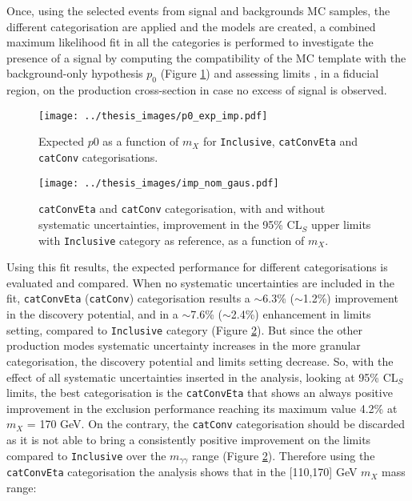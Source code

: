 \documentclass[a4paper, oneside, 11pt]{book}
\begin{document}
	Once, using the selected events from signal and backgrounds MC samples, the different categorisation are applied and the models are created, a combined maximum likelihood fit in all the categories is performed to investigate the presence of a signal by computing the compatibility of the MC template with the background-only hypothesis $p_0$ \cite{Statistic} (Figure \ref{fig:p0_comp}) and assessing limits \cite{Statistic}, in a fiducial region, on the production cross-section in case no excess of signal is observed.
	\iffalse
	\begin{figure}
		\centering
		\texttt{[image: ../thesis\_images/p0\_no\_catConvEta.pdf]}
		\caption{Expected $p_0$ values and observed ones values obtained by using signal+backgrounds template with $\mu$=1 and m$_X$ = 125 (140) GeV, for \texttt{Inclusive} categorisation, as function of $m_X$.}
		\label{fig:p0}
	\end{figure}
	\begin{figure}
		\centering
		\texttt{[image: ../thesis\_images/plot\_AsimovData\_0\_ggHyy\_MC\_no\_catConvEta\_syst\_HSM\_fid\_nom\_gaus.pdf]}
		\caption{95\% CL$_S$ upper limits plot for the \texttt{Inclusive} categorisation, as a function of $m_X$.}
		\label{fig:limits}
	\end{figure}
	\fi
	\begin{figure}
		\centering
		\texttt{[image: ../thesis\_images/p0\_exp\_imp.pdf]}
		\caption{Expected $p0$ as a function of $m_X$ for \texttt{Inclusive}, \texttt{catConvEta} and \texttt{catConv} categorisations.}
		\label{fig:p0_comp}
	\end{figure}
	\begin{figure}
		\centering
		\texttt{[image: ../thesis\_images/imp\_nom\_gaus.pdf]}
		\caption{\texttt{catConvEta} and \texttt{catConv} categorisation, with and without systematic uncertainties, improvement in the 95\% CL$_S$ upper limits with \texttt{Inclusive} category as reference, as a function of $m_X$.}
		\label{fig:limits_comp}
	\end{figure}Using this fit results, the expected performance for different categorisations is evaluated and compared. When no systematic uncertainties are included in the fit, \texttt{catConvEta} (\texttt{catConv}) categorisation results a $\sim$6.3\% ($\sim$1.2\%) improvement in the discovery potential, and in a $\sim$7.6\% ($\sim$2.4\%) enhancement in limits setting, compared to \texttt{Inclusive} category (Figure \ref{fig:limits_comp}). But since the other production modes systematic uncertainty increases in the more granular categorisation, the discovery potential and limits setting decrease. So, with the effect of all systematic uncertainties inserted in the analysis, looking at 95\% CL$_S$ limits, the best categorisation is the \texttt{catConvEta} that shows an always positive improvement in the exclusion performance reaching its maximum value 4.2\% at $m_X$ = 170 GeV. On the contrary, the \texttt{catConv} categorisation should be discarded as it is not able to bring a consistently positive improvement on the limits compared to \texttt{Inclusive} over the $m_{\gamma\gamma}$ range (Figure \ref{fig:limits_comp}). Therefore using the \texttt{catConvEta} categorisation the analysis shows that in the [110,170] GeV $m_X$ mass range:
\end{document}
